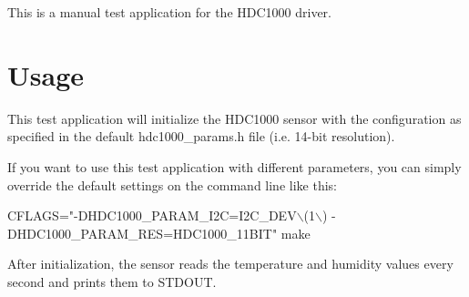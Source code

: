 This is a manual test application for the H\+D\+C1000 driver.

\section*{Usage}

This test application will initialize the H\+D\+C1000 sensor with the configuration as specified in the default {\ttfamily hdc1000\+\_\+params.\+h} file (i.\+e. 14-\/bit resolution).

If you want to use this test application with different parameters, you can simply override the default settings on the command line like this\+: 
\begin{DoxyCode}
CFLAGS="-DHDC1000\_PARAM\_I2C=I2C\_DEV\(\backslash\)(1\(\backslash\)) -DHDC1000\_PARAM\_RES=HDC1000\_11BIT" make
\end{DoxyCode}


After initialization, the sensor reads the temperature and humidity values every second and prints them to S\+T\+D\+O\+UT. 